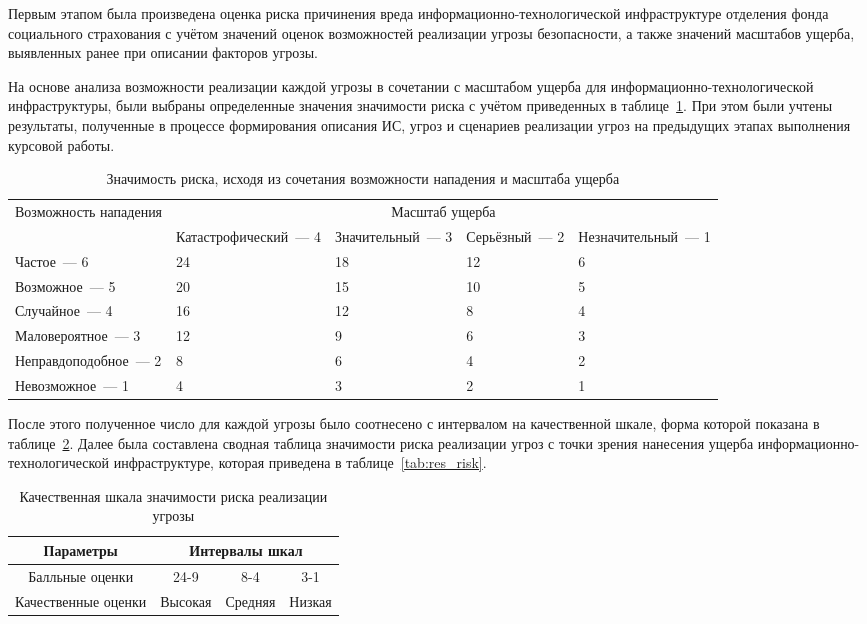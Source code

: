 \point Первым этапом была произведена оценка риска причинения вреда
информационно-технологической инфраструктуре отделения фонда
социального страхования с учётом значений оценок возможностей
реализации угрозы безопасности, а также значений масштабов ущерба,
выявленных ранее при описании факторов угрозы.

\point На основе анализа возможности реализации каждой угрозы в
сочетании с масштабом ущерба для информационно-технологической
инфраструктуры, были выбраны определенные значения значимости риска с
учётом приведенных в таблице~\ref{tab:risk}. При этом были учтены
результаты, полученные в процессе формирования описания ИС, угроз и
сценариев реализации угроз на предыдущих этапах выполнения курсовой
работы.

\begin{table}[h]
\caption{Значимость риска, исходя из сочетания возможности нападения и масштаба ущерба}
\label{tab:risk}
\small
\begin{tabular}{|p{4cm}|p{2.5cm}|p{2.5cm}|p{2.5cm}|p{2.5cm}|}
\hline
\multirow{2}{4cm}{Возможность нападения} & \multicolumn{4}{c|}{Масштаб
ущерба}\\\cline{2-5}
& Катастрофиче\-ский~--- 4 & Значитель\-ный~--- 3 & Серьёзный~--- 2 &
Незначитель\-ный~--- 1 \\\hline
Частое~--- 6 & 24 & 18 & 12 & 6 \\\hline
Возможное~--- 5 & 20 & 15 & 10 & 5 \\\hline
Случайное~--- 4 & 16 & 12 & 8 & 4 \\\hline
Маловероятное~--- 3 & 12 & 9 & 6 & 3 \\\hline
Неправдоподобное~--- 2 & 8 & 6 & 4 & 2 \\\hline
Невозможное~--- 1 & 4 & 3 & 2 & 1 \\\hline
\end{tabular}
\end{table}
\normalsize

\point После этого полученное число для каждой угрозы было соотнесено
с интервалом на качественной шкале, форма которой показана в
таблице~\ref{tab:risk_scal}. Далее была составлена сводная таблица
значимости риска реализации угроз с точки зрения нанесения ущерба
информационно-технологической инфраструктуре, которая приведена в
таблице~\ref{tab:res_risk}.

\begin{table}[h]
  \caption{Качественная шкала значимости риска реализации угрозы}
  \label{tab:risk_scal}
\small
  \begin{tabular}{|c|c|c|c|}
    \hline
    Параметры & \multicolumn{3}{c|}{Интервалы шкал}\\\hline
    Балльные оценки &  24-9 & 8-4 & 3-1 \\\hline
    Качественные оценки & Высокая & Средняя & Низкая \\\hline
  \end{tabular}
\end{table}
\normalsize

